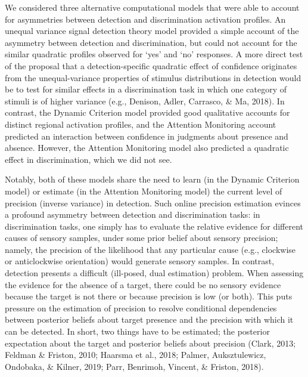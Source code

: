 \documentclass[12pt,twoside]{reedthesis}
\begin{document}
We considered three alternative computational models that were able to account for asymmetries between detection and discrimination activation profiles. An unequal variance signal detection theory model provided a simple account of the asymmetry between detection and discrimination, but could not account for the similar quadratic profiles observed for `yes' and `no' responses. A more direct test of the proposal that a detection-specific quadratic effect of confidence originates from the unequal-variance properties of stimulus distributions in detection would be to test for similar effects in a discrimination task in which one category of stimuli is of higher variance (e.g., Denison, Adler, Carrasco, \& Ma, 2018). In contrast, the Dynamic Criterion model provided good qualitative accounts for distinct regional activation profiles, and the Attention Monitoring account predicted an interaction between confidence in judgments about presence and absence. However, the Attention Monitoring model also predicted a quadratic effect in discrimination, which we did not see.

Notably, both of these models share the need to learn (in the Dynamic Criterion model) or estimate (in the Attention Monitoring model) the current level of precision (inverse variance) in detection. Such online precision estimation evinces a profound asymmetry between detection and discrimination tasks: in discrimination tasks, one simply has to evaluate the relative evidence for different causes of sensory samples, under some prior belief about sensory precision; namely, the precision of the likelihood that any particular cause (e.g., clockwise or anticlockwise orientation) would generate sensory samples. In contrast, detection presents a difficult (ill-posed, dual estimation) problem. When assessing the evidence for the absence of a target, there could be no sensory evidence because the target is not there or because precision is low (or both). This puts pressure on the estimation of precision to resolve conditional dependencies between posterior beliefs about target presence and the precision with which it can be detected. In short, two things have to be estimated; the posterior expectation about the target and posterior beliefs about precision (Clark, 2013; Feldman \& Friston, 2010; Haarsma et al., 2018; Palmer, Auksztulewicz, Ondobaka, \& Kilner, 2019; Parr, Benrimoh, Vincent, \& Friston, 2018).
\end{document}
